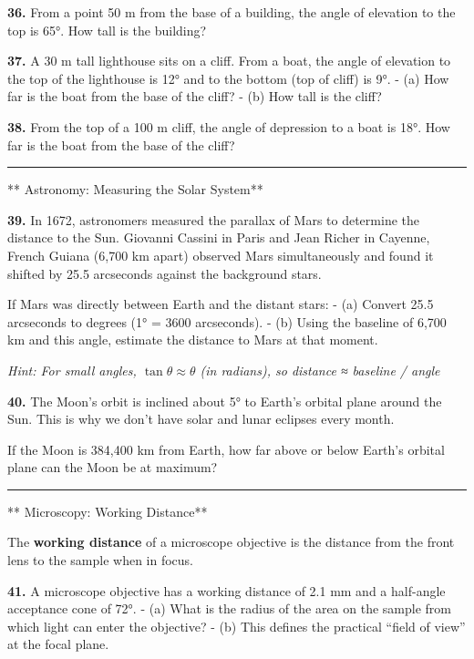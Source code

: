 \documentclass[
  11pt,
]{article}
\begin{document}
\textbf{36.} From a point 50 m from the base of a building, the angle of
elevation to the top is 65°. How tall is the building?

\textbf{37.} A 30 m tall lighthouse sits on a cliff. From a boat, the
angle of elevation to the top of the lighthouse is 12° and to the bottom
(top of cliff) is 9°. - (a) How far is the boat from the base of the
cliff? - (b) How tall is the cliff?

\textbf{38.} From the top of a 100 m cliff, the angle of depression to a
boat is 18°. How far is the boat from the base of the cliff?

\begin{center}\rule{0.5\linewidth}{0.5pt}\end{center}

** Astronomy: Measuring the Solar System**

\textbf{39.} In 1672, astronomers measured the parallax of Mars to
determine the distance to the Sun. Giovanni Cassini in Paris and Jean
Richer in Cayenne, French Guiana (6,700 km apart) observed Mars
simultaneously and found it shifted by 25.5 arcseconds against the
background stars.

If Mars was directly between Earth and the distant stars: - (a) Convert
25.5 arcseconds to degrees (1° = 3600 arcseconds). - (b) Using the
baseline of 6,700 km and this angle, estimate the distance to Mars at
that moment.

\emph{Hint: For small angles, \(\tan\theta \approx \theta\) (in
radians), so distance ≈ baseline / angle}

\textbf{40.} The Moon's orbit is inclined about 5° to Earth's orbital
plane around the Sun. This is why we don't have solar and lunar eclipses
every month.

If the Moon is 384,400 km from Earth, how far above or below Earth's
orbital plane can the Moon be at maximum?

\begin{center}\rule{0.5\linewidth}{0.5pt}\end{center}

** Microscopy: Working Distance**

The \textbf{working distance} of a microscope objective is the distance
from the front lens to the sample when in focus.

\textbf{41.} A microscope objective has a working distance of 2.1 mm and
a half-angle acceptance cone of 72°. - (a) What is the radius of the
area on the sample from which light can enter the objective? - (b) This
defines the practical ``field of view'' at the focal plane.
\end{document}
